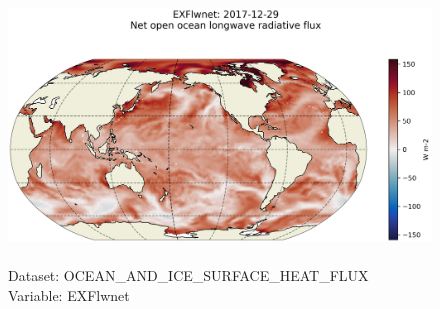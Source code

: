 \begin{figure}[H]
\centering
\includegraphics[scale=0.5]{../images/plots/latlon_plots/Ocean_and_Sea-Ice_Surface_Heat_Fluxes/EXFlwnet.png}
\caption{\\Dataset: OCEAN\_AND\_ICE\_SURFACE\_HEAT\_FLUX\\Variable: EXFlwnet}
\label{tab:table-OCEAN_AND_ICE_SURFACE_HEAT_FLUX_EXFlwnet-Plot}
\end{figure}
\pagebreak

